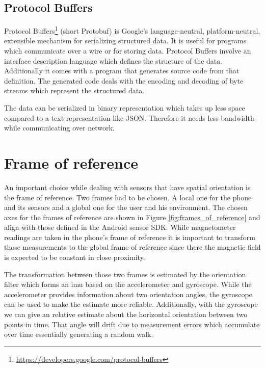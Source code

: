 \subsection{Protocol Buffers}
\label{sec:protobuf}

Protocol Buffers\footnote{\url{https://developers.google.com/protocol-buffers}} (short Protobuf) is Google's language-neutral, platform-neutral, extensible mechanism for serializing structured data. It is useful for programs which communicate over a wire or for storing data. Protocol Buffers involve an interface description language which defines the structure of the data. Additionally it comes with a program that generates source code from that definition. The generated code deals with the encoding and decoding of byte streams which represent the structured data.

The data can be serialized in binary representation which takes up less space compared to a text representation like JSON. Therefore it needs less bandwidth while communicating over network.

\section{Frame of reference}

An important choice while dealing with sensors that have spatial orientation is the frame of reference. Two frames had to be chosen. A local one for the phone and its sensors and a global one for the user and his environment. The chosen axes for the frames of reference are shown in Figure \ref{fig:frames_of_reference} and align with those defined in the Android sensor SDK. While magnetometer readings are taken in the phone's frame of reference it is important to transform those measurements to the global frame of reference since there the magnetic field is expected to be constant in close proximity.\cite{android_sdk_sensorevent}

The transformation between those two frames is estimated by the orientation filter which forms an \gls{imu} based on the accelerometer and gyroscope. While the accelerometer provides information about two orientation angles, the gyroscope can be used to make the estimate more reliable. Additionally, with the gyroscope we can give an relative estimate about the horizontal orientation between two points in time. That angle will drift due to measurement errors which accumulate over time essentially generating a random walk.

